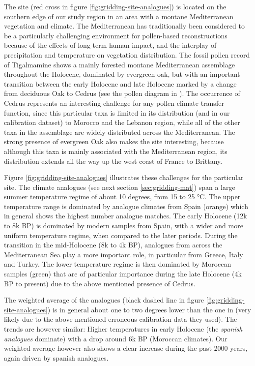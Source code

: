 \documentclass[
11pt, %
english, %
singlespacing, %
headsepline, %
]{MastersDoctoralThesis} %
\begin{document}
\begin{NoHyper}
\begin{refsection}
The site (red cross in figure \ref{fig:gridding-site-analogues}) is located on the southern edge of our study region in an area with a montane Mediterranean vegetation and climate. The Mediterranean has traditionally been considered to be a particularly challenging environment for pollen-based reconstructions because of the effects of long term human impact, and the interplay of precipitation and temperature on vegetation distribution. The fossil pollen record of Tigalmamine shows a mainly forested montane Mediterranean assemblage throughout the Holocene, dominated by evergreen oak, but with an important transition between the early Holocene and late Holocene marked by a change from deciduous Oak to Cedrus (see the pollen diagram in \cite{CheddadiLambGuiotEtAl1998}). The occurrence of Cedrus represents an interesting challenge for any pollen climate transfer function, since this particular taxa is limited in its distribution (and in our calibration dataset) to Morocco and the Lebanon region, while all of the other taxa in the assemblage are widely distributed across the Mediterranean. The strong presence of evergreen Oak also makes the site interesting, because although this taxa is mainly associated with the Mediterranean region, its distribution extends all the way up the west coast of France to Brittany.

Figure \ref{fig:gridding-site-analogues} illustrates these challenges for the particular site. The climate analogues (see next section \ref{sec:gridding-mat}) span a large summer temperature regime of about 10 degrees, from 15 to 25 °C. The upper temperature range is dominated by analogue climates from Spain (orange) which in general shows the highest number analogue matches. The early Holocene (12k to 8k BP) is dominated by modern samples from Spain, with a wider and more uniform temperature regime, when compared to the later periods. During the transition in the mid-Holocene (8k to 4k BP), analogues from across the Mediterranean Sea play a more important role, in particular from Greece, Italy and Turkey. The lower temperature regime is then dominated by Moroccan samples (green) that are of particular importance during the late Holocene (4k BP to present) due to the above mentioned presence of Cedrus. 

The weighted average of the analogues (black dashed line in figure \ref{fig:gridding-site-analogues}) is in general about one to two degrees lower than the one in \cite{CheddadiLambGuiotEtAl1998} (very likely due to the above-mentioned erroneous calibration data they used). The trends are however similar: Higher temperatures in early Holocene  (the \textit{spanish analogues} dominate) with a drop around 6k BP (Moroccan climates). Our weighted average however also shows a clear increase during the past 2000 years, again driven by spanish analogues.


\end{refsection}
\end{NoHyper}
\end{document}
